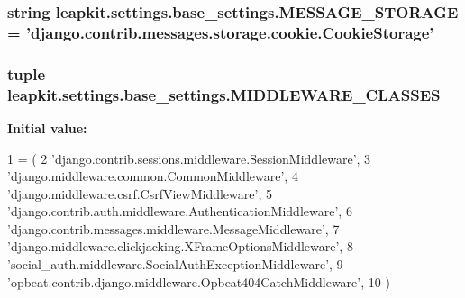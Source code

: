 \hypertarget{namespaceleapkit_1_1settings_1_1base__settings_adb93bb897c5ca3ad1b118bdc216c1941}{
\subsubsection[{M\-E\-S\-S\-A\-G\-E\-\_\-\-S\-T\-O\-R\-A\-G\-E}]{\setlength{\rightskip}{0pt plus 5cm}string leapkit.\-settings.\-base\-\_\-settings.\-M\-E\-S\-S\-A\-G\-E\-\_\-\-S\-T\-O\-R\-A\-G\-E = 'django.\-contrib.\-messages.\-storage.\-cookie.\-Cookie\-Storage'}}\label{namespaceleapkit_1_1settings_1_1base__settings_adb93bb897c5ca3ad1b118bdc216c1941}
\hypertarget{namespaceleapkit_1_1settings_1_1base__settings_a20a1007ef083dbf3b48e9e18c1771846}{
\subsubsection[{M\-I\-D\-D\-L\-E\-W\-A\-R\-E\-\_\-\-C\-L\-A\-S\-S\-E\-S}]{\setlength{\rightskip}{0pt plus 5cm}tuple leapkit.\-settings.\-base\-\_\-settings.\-M\-I\-D\-D\-L\-E\-W\-A\-R\-E\-\_\-\-C\-L\-A\-S\-S\-E\-S}}\label{namespaceleapkit_1_1settings_1_1base__settings_a20a1007ef083dbf3b48e9e18c1771846}
{\bfseries Initial value\-:}
\begin{DoxyCode}
1 = (
2     \textcolor{stringliteral}{'django.contrib.sessions.middleware.SessionMiddleware'},
3     \textcolor{stringliteral}{'django.middleware.common.CommonMiddleware'},
4     \textcolor{stringliteral}{'django.middleware.csrf.CsrfViewMiddleware'},
5     \textcolor{stringliteral}{'django.contrib.auth.middleware.AuthenticationMiddleware'},
6     \textcolor{stringliteral}{'django.contrib.messages.middleware.MessageMiddleware'},
7     \textcolor{stringliteral}{'django.middleware.clickjacking.XFrameOptionsMiddleware'},
8     \textcolor{stringliteral}{'social\_auth.middleware.SocialAuthExceptionMiddleware'},
9     \textcolor{stringliteral}{'opbeat.contrib.django.middleware.Opbeat404CatchMiddleware'},
10 )
\end{DoxyCode}
